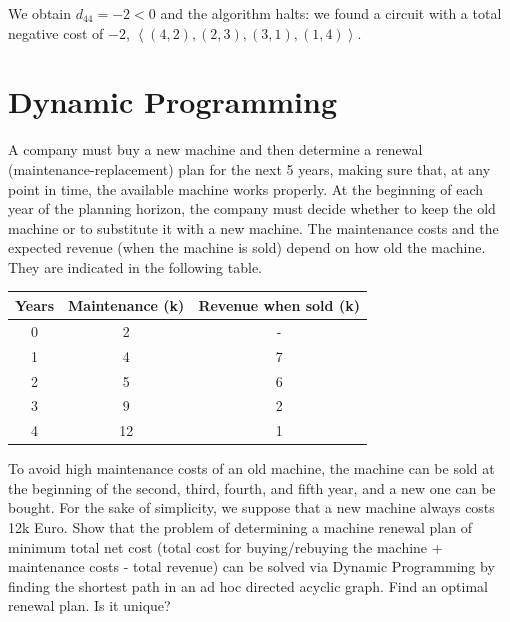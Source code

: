 \documentclass[12pt, a4paper]{report}
\begin{document}
        We obtain $d_{44} = -2 < 0$ and the algorithm halts: we found a circuit with a total negative cost of $-2$, $\left\langle (4, 2),(2, 3),(3, 1),(1, 4) \right\rangle $.

    \newpage

    \section{Dynamic Programming}
        A company must buy a new machine and then determine a renewal (maintenance-replacement) plan for the next 5 years, making sure that, at any point in time, the available
        machine works properly. At the beginning of each year of the planning horizon, the company must decide whether to keep the old machine or to substitute it with a new 
        machine. The maintenance costs and the expected revenue (when the machine is sold) depend on how old the machine. They are indicated in the following table.
        \begin{table}[H]
            \centering
            \begin{tabular}{ccc}
            \hline
            \textbf{Years} & \textbf{Maintenance (k)} & \textbf{Revenue when sold (k)} \\ \hline
            0              & 2                        & -                              \\
            1              & 4                        & 7                              \\
            2              & 5                        & 6                              \\
            3              & 9                        & 2                              \\
            4              & 12                       & 1                              \\ \hline
            \end{tabular}
        \end{table}
        To avoid high maintenance costs of an old machine, the machine can be sold at the beginning of the second, third, fourth, and fifth year, and a new one can be bought. 
        For the sake of simplicity, we suppose that a new machine always costs 12k Euro. Show that the problem of determining a machine renewal plan of minimum total net cost 
        (total cost for buying/rebuying the machine + maintenance costs - total revenue) can be solved via Dynamic Programming by finding the shortest path in an ad hoc 
        directed acyclic graph. Find an optimal renewal plan. Is it unique?
\end{document}
